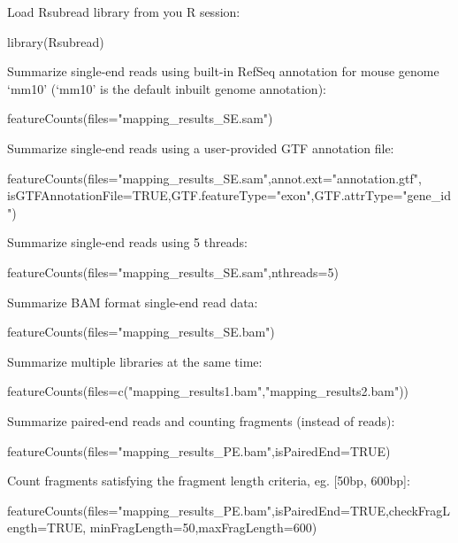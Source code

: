 \documentclass[12pt]{report}
\newcommand{\Rsubread}{\textsf{Rsubread}}
\newcommand{\R}{\textsf{R}}
\begin{document}
\noindent Load {\Rsubread} library from you {\R} session:

\begin{Rcode}
library(Rsubread)
\end{Rcode}

\noindent Summarize single-end reads using built-in RefSeq annotation for mouse genome `mm10' (`mm10' is the default inbuilt genome annotation):
\begin{Rcode}
featureCounts(files="mapping_results_SE.sam")
\end{Rcode}

\noindent Summarize single-end reads using a user-provided GTF annotation file:

\begin{Rcode}
featureCounts(files="mapping_results_SE.sam",annot.ext="annotation.gtf",
isGTFAnnotationFile=TRUE,GTF.featureType="exon",GTF.attrType="gene_id")
\end{Rcode}

\noindent Summarize single-end reads using 5 threads:

\begin{Rcode}
featureCounts(files="mapping_results_SE.sam",nthreads=5)
\end{Rcode}

\noindent Summarize BAM format single-end read data:

\begin{Rcode}
featureCounts(files="mapping_results_SE.bam")
\end{Rcode}

\noindent Summarize multiple libraries at the same time:

\begin{Rcode}
featureCounts(files=c("mapping_results1.bam","mapping_results2.bam"))
\end{Rcode}

\noindent Summarize paired-end reads and counting fragments (instead of reads):

\begin{Rcode}
featureCounts(files="mapping_results_PE.bam",isPairedEnd=TRUE)
\end{Rcode}

\noindent Count fragments satisfying the fragment length criteria, eg. [50bp, 600bp]:

\begin{Rcode}
featureCounts(files="mapping_results_PE.bam",isPairedEnd=TRUE,checkFragLength=TRUE,
minFragLength=50,maxFragLength=600)
\end{Rcode}
\end{document}
